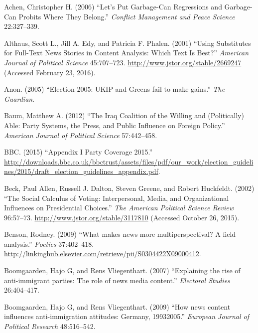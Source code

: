 \documentclass[12pt,article]{article}
\begin{document}
\raggedright

\setlength\parindent{0pt}

\hypertarget{refs}{}
\hypertarget{ref-Achen:2006fp}{}
Achen, Christopher H. (2006) ``Let's Put Garbage-Can Regressions and
Garbage-Can Probits Where They Belong.'' \emph{Conflict Management and
Peace Science} 22:327--339.

\hypertarget{ref-althausux5fusingux5f2001}{}
Althaus, Scott L., Jill A. Edy, and Patricia F. Phalen. (2001) ``Using
Substitutes for Full-Text News Stories in Content Analysis: Which Text
Is Best?'' \emph{American Journal of Political Science} 45:707--723.
\url{http://www.jstor.org/stable/2669247} (Accessed February 23, 2016).

\hypertarget{ref-ux5felectionux5f2005}{}
Anon. (2005) ``Election 2005: UKIP and Greens fail to make gains.''
\emph{The Guardian}.

\hypertarget{ref-Baum:2012je}{}
Baum, Matthew A. (2012) ``The Iraq Coalition of the Willing and
(Politically) Able: Party Systems, the Press, and Public Influence on
Foreign Policy.'' \emph{American Journal of Political Science}
57:442--458.

\hypertarget{ref-BBC:R6UMvIKM}{}
BBC. (2015) ``Appendix I Party Coverage 2015.''
\url{http://downloads.bbc.co.uk/bbctrust/assets/files/pdf/our_work/election_guidelines/2015/draft_election_guidelines_appendix.pdf}.

\hypertarget{ref-beckux5fsocialux5f2002}{}
Beck, Paul Allen, Russell J. Dalton, Steven Greene, and Robert
Huckfeldt. (2002) ``The Social Calculus of Voting: Interpersonal, Media,
and Organizational Influences on Presidential Choices.'' \emph{The
American Political Science Review} 96:57--73.
\url{http://www.jstor.org/stable/3117810} (Accessed October 26, 2015).

\hypertarget{ref-Benson:2009kb}{}
Benson, Rodney. (2009) ``What makes news more multiperspectival? A field
analysis.'' \emph{Poetics} 37:402--418.
\url{http://linkinghub.elsevier.com/retrieve/pii/S0304422X09000412}.

\hypertarget{ref-Boomgaarden:2007ia}{}
Boomgaarden, Hajo G, and Rens Vliegenthart. (2007) ``Explaining the rise
of anti-immigrant parties: The role of news media content.''
\emph{Electoral Studies} 26:404--417.

\hypertarget{ref-Boomgaarden:2009ke}{}
Boomgaarden, Hajo G, and Rens Vliegenthart. (2009) ``How news content
influences anti-immigration attitudes: Germany, 19932005.''
\emph{European Journal of Political Research} 48:516--542.
\end{document}
